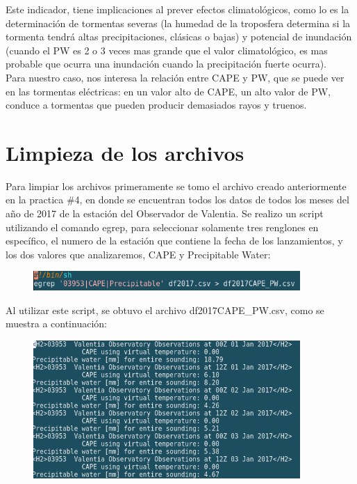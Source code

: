 \documentclass[12pt]{article}
\begin{document}
Este indicador, tiene implicaciones al prever efectos climatológicos, como lo es la determinación de tormentas severas (la humedad de la troposfera determina si la tormenta tendrá altas precipitaciones, clásicas o bajas) y potencial de inundación (cuando el PW es 2 o 3 veces mas grande que el valor climatológico, es mas probable que ocurra una inundación cuando la precipitación fuerte ocurra). \\

Para nuestro caso, nos interesa la relación entre CAPE y PW, que se puede ver en las tormentas eléctricas: en un valor alto de CAPE, un alto valor de PW, conduce a tormentas que pueden producir demasiados rayos y truenos. 

\section{Limpieza de los archivos}
Para limpiar los archivos primeramente se tomo el archivo creado anteriormente en la practica \#4, en donde se encuentran todos los datos de todos los meses del año de 2017 de la estación del Observador de Valentia. Se realizo un script utilizando el comando egrep, para seleccionar solamente tres renglones en específico, el numero de la estación que contiene la fecha de los lanzamientos, y los dos valores que analizaremos, CAPE y Precipitable Water:

\begin{figure}[h]
    \centering
\includegraphics[width=4in]{script1.png}
\end{figure}

Al utilizar este script, se obtuvo el archivo df2017CAPE\_PW.csv, como se muestra a continuación: 

\begin{figure}[h]
    \centering
\includegraphics[width=4in]{1archivo.png}
\end{figure}
\end{document}
